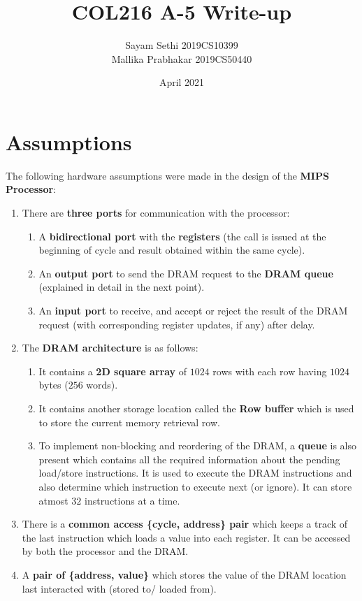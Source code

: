 \documentclass{article}
\title{COL216 A-5 Write-up}
\author{Sayam Sethi 2019CS10399 \\ Mallika Prabhakar 2019CS50440 }
\date{April 2021}
\begin{document}
\maketitle

\section{Assumptions}
The following hardware assumptions were made in the design of the \textbf{MIPS Processor}:
\begin{enumerate}
    \item There are \textbf{three ports} for communication with the processor:
        \begin{enumerate}
            \item A \textbf{bidirectional port} with the \textbf{registers} (the call is issued at the beginning of cycle and result obtained within the same cycle).
            \item An \textbf{output port} to send the DRAM request to the \textbf{DRAM queue} (explained in detail in the next point).
            \item An \textbf{input port} to receive, and accept or reject the result of the DRAM request (with corresponding register updates, if any) after delay.
        \end{enumerate}
    \item The \textbf{DRAM architecture} is as follows:
        \begin{enumerate}
            \item It contains a \textbf{2D square array} of $1024$ rows with each row having $1024$ bytes ($256$ words).
            \item It contains another storage location called the \textbf{Row buffer} which is used to store the current memory retrieval row.
            \item To implement non-blocking and reordering of the DRAM, a \textbf{queue} is also present which contains all the required information about the pending load/store instructions. It is used to execute the DRAM instructions and also determine which instruction to execute next (or ignore). It can store atmost $32$ instructions at a time.
        \end{enumerate}
    \item There is a \textbf{common access \{cycle, address\} pair} which keeps a track of the last instruction which loads a value into each register. It can be accessed by both the processor and the DRAM.
    \item A \textbf{pair of \{address, value\}} which stores the value of the DRAM location last interacted with (stored to/ loaded from).
\end{enumerate}
\end{document}
